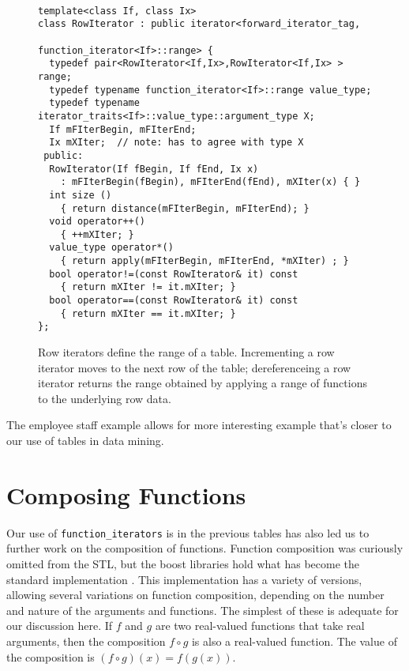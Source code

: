\documentclass[12pt]{article}
\begin{document}
\begin{figure}
\label{figure:row iterators}
\caption{Row iterators define the range of a table. Incrementing a row
iterator moves to the next row of the table; dereferenceing a row
iterator returns the range obtained by applying a range of functions
to the underlying row data.}
\begin{verbatim}

template<class If, class Ix>
class RowIterator : public iterator<forward_iterator_tag, 
                                    function_iterator<If>::range> {
  typedef pair<RowIterator<If,Ix>,RowIterator<If,Ix> > range;
  typedef typename function_iterator<If>::range value_type;
  typedef typename iterator_traits<If>::value_type::argument_type X;
  If mFIterBegin, mFIterEnd;
  Ix mXIter;  // note: has to agree with type X
 public:
  RowIterator(If fBegin, If fEnd, Ix x)
    : mFIterBegin(fBegin), mFIterEnd(fEnd), mXIter(x) { }
  int size () 
    { return distance(mFIterBegin, mFIterEnd); }
  void operator++() 
    { ++mXIter; }
  value_type operator*() 
    { return apply(mFIterBegin, mFIterEnd, *mXIter) ; }
  bool operator!=(const RowIterator& it) const 
    { return mXIter != it.mXIter; }
  bool operator==(const RowIterator& it) const
    { return mXIter == it.mXIter; }
};
\end{verbatim}
\end{figure}




  The employee staff example allows for more interesting example
that's closer to our use of tables in data mining.



\section{Composing Functions}

  Our use of {\tt function\_iterators} is in the previous tables has
also led us to further work on the composition of functions.  Function
composition was curiously omitted from the STL, but the boost
libraries hold what has become the standard implementation
\citep{josuttis99}.  This implementation has a variety of versions,
allowing several variations on function composition, depending on the
number and nature of the arguments and functions.  The simplest of
these is adequate for our discussion here.  If $f$ and $g$ are two
real-valued functions that take real arguments, then the composition
$f \circ g$ is also a real-valued function.  The value of the
composition is $(f \circ g)(x) = f(g(x))$.
\end{document}
